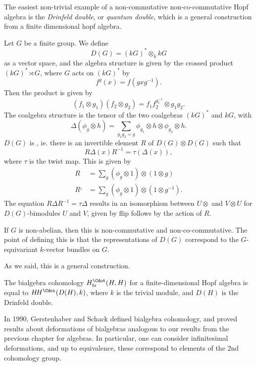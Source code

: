 \documentclass[a4paper]{article}
\newcommand\HH{H\!H}
\begin{document}
The easiest non-trivial example of a non-commutative non-co-commutative Hopf algebra is the \emph{Drinfeld double}, or \emph{quantum double}, which is a general construction from a finite dimensional hopf algebra.

\begin{defi}
  Let $G$ be a finite group. We define
  \[
    D(G) = (kG)^* \otimes_k kG
  \]
  as a vector space, and the algebra structure is given by the crossed product $(kG)^* \rtimes G$, where $G$ acts on $(kG)^*$ by
  \[
    f^g(x) = f(gxg^{-1}).
  \]
  Then the product is given by
  \[
    (f_1 \otimes g_1) (f_2 \otimes g_2) = f_1 f_2^{g_1^{-1}} \otimes g_1 g_2.
  \]
  The coalgebra structure is the tensor of the two coalgebras $(kG)^*$ and $kG$, with
  \[
    \Delta (\phi_g \otimes h) = \sum_{g_1 g_2 = g} \phi_{g_1} \otimes h \otimes \phi_{g_2} \otimes h.
  \]
  $D(G)$ is , ie. there is an invertible element $R$ of $D(G) \otimes D(G)$ such that
  \[
    R \Delta (x) R^{-1} = \tau (\Delta(x)),
  \]
  where $\tau$ is the twist map. This is given by
  \begin{align*}
    R &= \sum_g (\phi_g \otimes 1) \otimes (1 \otimes g)\\
    R^{_1} &= \sum_g (\phi_g \otimes 1) \otimes (1 \otimes g^{-1}).
  \end{align*}
  The equation $R \Delta R^{-1} = \tau \Delta$ results in an isomorphism between $ U \otimes $ and $V \otimes U$ for $D(G)$-bimodules $U$ and $V$, given by flip follows by the action of $R$.
\end{defi}
If $G$ is non-abelian, then this is non-commutative and non-co-commutative. The point of defining this is that the representations of $D(G)$ correspond to the $G$-equivariant $k$-vector bundles on $G$.

As we said, this is a general construction.
\begin{thm} %
  The bialgebra cohomology $H^{\Cdot}_{bi}(H, H)$ for a finite-dimensional Hopf algebra is equal to $\HH^{\Cdot}(D(H), k)$, where $k$ is the trivial module, and $D(H)$ is the Drinfeld double.
\end{thm}
\separator

In 1990, Gerstenhaber and Schack defined bialgebra cohomology, and proved results about deformations of bialgebras analogous to our results from the previous chapter for algebras. In particular, one can consider infinitesimal deformations, and up to equivalence, these correspond to elements of the $2$nd cohomology group.
\end{document}
